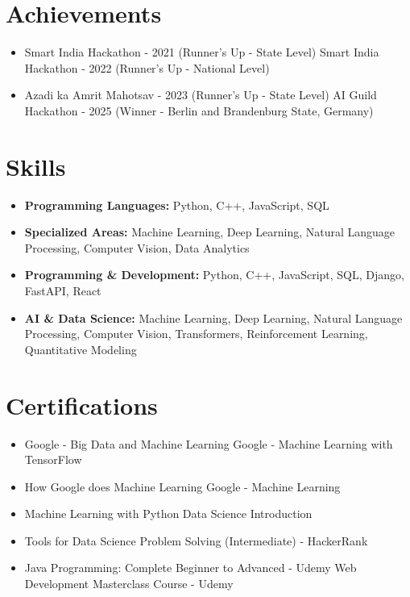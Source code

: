 \documentclass[a4paper,10pt]{article}
\begin{document}
\section*{Achievements}
\begin{itemize}
\item Smart India Hackathon - 2021 (Runner's Up - State Level) \hfill Smart India Hackathon - 2022 (Runner's Up - National Level)
\item Azadi ka Amrit Mahotsav - 2023 (Runner's Up - State Level) \hfill AI Guild Hackathon - 2025 (Winner - Berlin and Brandenburg State, Germany)
\end{itemize}

\section*{Skills}
\begin{itemize}
  \item \textbf{Programming Languages:} Python, C++, JavaScript, SQL
  \item \textbf{Specialized Areas:} Machine Learning, Deep Learning, Natural Language Processing, Computer Vision, Data Analytics
  \item \textbf{Programming \& Development:} Python, C++, JavaScript, SQL, Django, FastAPI, React
  \item \textbf{AI \& Data Science:} Machine Learning, Deep Learning, Natural Language Processing, Computer Vision, Transformers, Reinforcement Learning, Quantitative Modeling
\end{itemize}

\section*{Certifications}
\begin{itemize}
\item Google - Big Data and Machine Learning \hfill Google - Machine Learning with TensorFlow
\item How Google does Machine Learning \hfill Google - Machine Learning
\item Machine Learning with Python \hfill Data Science Introduction
\item Tools for Data Science \hfill Problem Solving (Intermediate) - HackerRank
\item Java Programming: Complete Beginner to Advanced - Udemy \hfill Web Development Masterclass Course - Udemy
\end{itemize}
\end{document}
